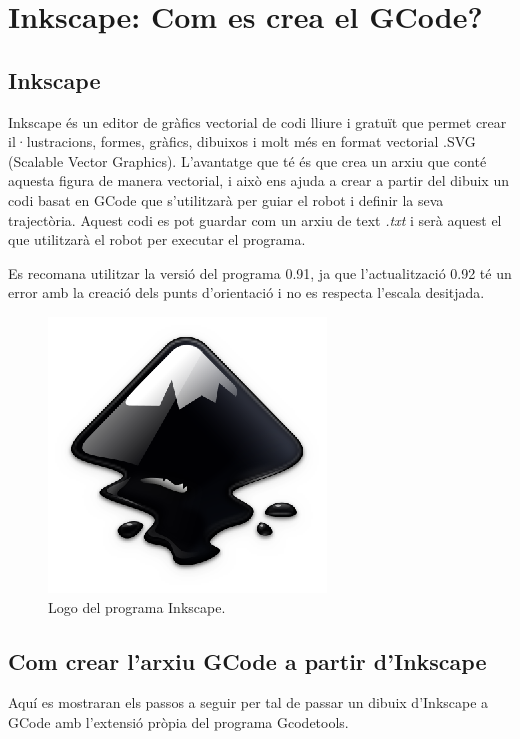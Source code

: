 \section{Inkscape: Com es crea el GCode?}

\subsection{Inkscape}

Inkscape és un editor de gràfics vectorial de codi lliure i gratuït que permet crear il·lustracions, formes, gràfics, dibuixos i molt més en format vectorial .SVG (Scalable Vector Graphics). L'avantatge que té és que crea un arxiu que conté aquesta figura de manera vectorial, i això ens ajuda a crear a partir del dibuix un codi basat en GCode que s'utilitzarà per guiar el robot i definir la seva trajectòria. Aquest codi es pot guardar com un arxiu de text \emph{.txt} i serà aquest el que utilitzarà el robot per executar el programa.

Es recomana utilitzar la versió del programa 0.91, ja que l'actualització 0.92 té un error amb la creació dels punts d'orientació i no es respecta l'escala desitjada. 

\begin{figure}[H]
	\centering
	\includegraphics[scale=1]{inkscape-logo.eps}
	\caption{Logo del programa Inkscape.}
	\label{fig:inkscapelogo}
\end{figure}

\subsection{Com crear l'arxiu GCode a partir d'Inkscape} \label{sec:ManualInk}

 Aquí es mostraran els passos a seguir per tal de passar un dibuix d'Inkscape a GCode amb l'extensió pròpia del programa Gcodetools.


